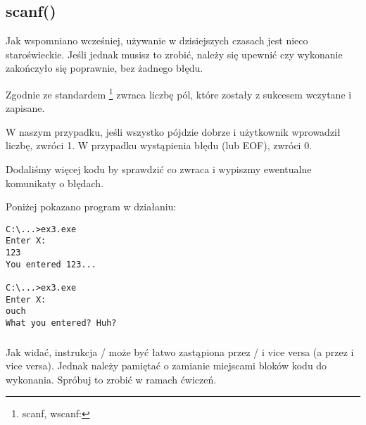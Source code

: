 \subsection{scanf()}

Jak wspomniano wcześniej, używanie \scanf w dzisiejszych czasach jest nieco staroświeckie.
Jeśli jednak musisz to zrobić, należy się upewnić czy wykonanie \scanf zakończyło się poprawnie, bez żadnego błędu.



Zgodnie ze standardem \scanf\footnote{scanf, wscanf: \MSDNscanf{}} zwraca liczbę pól, które zostały z sukcesem wczytane i zapisane.

W naszym przypadku, jeśli wszystko pójdzie dobrze i użytkownik wprowadził liczbę, \scanf zwróci 1. W przypadku wystąpienia błędu (lub \ac{EOF}), zwróci 0.

Dodaliśmy więcej kodu by sprawdzić co zwraca \scanf i wypiszmy ewentualne komunikaty o błędach.

Poniżej pokazano program w działaniu:

\begin{lstlisting}
C:\...>ex3.exe
Enter X:
123
You entered 123...

C:\...>ex3.exe
Enter X:
ouch
What you entered? Huh?
\end{lstlisting}






\subsubsection{\Exercise}

Jak widać, instrukcja / może być łatwo zastąpiona przez / i vice versa
(a  przez  i vice versa).
Jednak należy pamiętać o zamianie miejscami bloków kodu do wykonania. Spróbuj to zrobić w ramach ćwiczeń.

